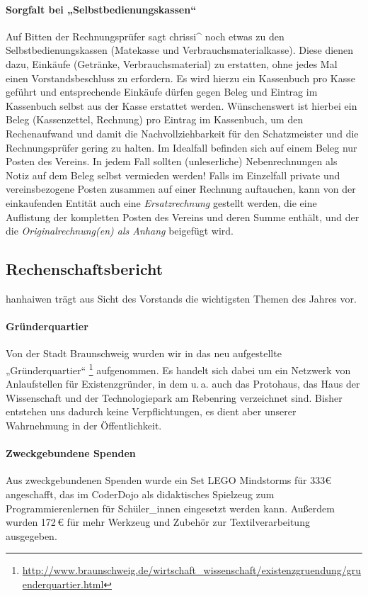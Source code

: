 \documentclass[parskip=half-]{s0minutes}
\begin{document}
\paragraph{Sorgfalt bei „Selbstbedienungskassen“}
Auf Bitten der Rechnungsprüfer sagt chrissi\^{} noch etwas zu den
Selbstbedienungskassen (Matekasse und Verbrauchsmaterialkasse). Diese dienen
dazu, Einkäufe (Getränke, Verbrauchsmaterial) zu erstatten, ohne jedes Mal einen
Vorstandsbeschluss zu erfordern. Es wird hierzu ein Kassenbuch pro Kasse geführt
und entsprechende Einkäufe dürfen gegen Beleg und Eintrag im Kassenbuch selbst
aus der Kasse erstattet werden. Wünschenswert ist hierbei ein Beleg
(Kassenzettel, Rechnung) pro Eintrag im Kassenbuch, um den Rechenaufwand und
damit die Nachvollziehbarkeit für den Schatzmeister und die Rechnungsprüfer
gering zu halten. Im Idealfall befinden sich auf einem Beleg nur Posten des
Vereins. In jedem Fall sollten (unleserliche) Nebenrechnungen als Notiz auf dem
Beleg selbst vermieden werden! Falls im Einzelfall private und vereinsbezogene
Posten zusammen auf einer Rechnung auftauchen, kann von der einkaufenden Entität
auch eine \emph{Ersatzrechnung} gestellt werden, die eine Auflistung der
kompletten Posten des Vereins und deren Summe enthält, und der die
\emph{Originalrechnung(en) als Anhang} beigefügt wird.

\subsection{Rechenschaftsbericht}
hanhaiwen trägt aus Sicht des Vorstands die wichtigsten Themen des Jahres vor.

\paragraph{Gründerquartier}
Von der Stadt Braunschweig wurden wir in das neu aufgestellte „Gründerquartier“
\footnote{\url{http://www.braunschweig.de/wirtschaft_wissenschaft/existenzgruendung/gruenderquartier.html}}
aufgenommen. Es handelt sich dabei um ein Netzwerk von Anlaufstellen für
Existenzgründer, in dem u.\,a. auch das Protohaus, das Haus der Wissenschaft
und der Technologiepark am Rebenring verzeichnet sind. Bisher entstehen uns
dadurch keine Verpflichtungen, es dient aber unserer Wahrnehmung in der
Öffentlichkeit.

\paragraph{Zweckgebundene Spenden} Aus zweckgebundenen Spenden wurde ein Set
LEGO Mindstorms für 333€ angeschafft, das im CoderDojo als didaktisches
Spielzeug zum Programmierenlernen für Schüler\_innen eingesetzt werden kann.
Außerdem wurden 172\,€ für mehr Werkzeug und Zubehör zur Textilverarbeitung
ausgegeben.
\end{document}
